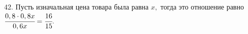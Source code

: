 42. Пусть изначальная цена товара была равна $x,$ тогда это отношение равно $\cfrac{0,8\cdot0,8x}{0,6x}=\cfrac{16}{15}.$\\
